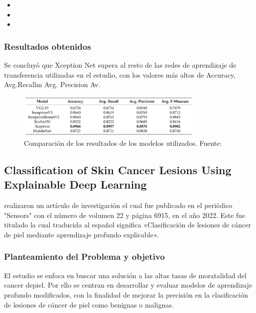 \begin{itemize}
	\item \TIDLone
	\item \TIDLtwo
	\item \TIDLthree
\end{itemize}


\subsubsection{Resultados obtenidos}
Se concluyó que Xception Net supera al resto de las redes de aprendizaje de transferencia utilizadas en el estudio, con los valores más altos de Accuracy, Avg.Recallm Avg. Precision Av.

\begin{figure}[h]
	\begin{center}
		\includegraphics[width=0.8\textwidth]{2/figuras/Deep_Learning_Based_Transfer_Learning_imagen_01.png}
		\caption{Comparación de los resultados de los modelos utilizados. Fuente: \cite{jain2021deep}}
		\label{1:fig 3}
	\end{center}
\end{figure}




\subsection{Classification of Skin Cancer Lesions Using Explainable	Deep Learning \citep*{goceri2023classification}}
\citeauthor{goceri2023classification} realizaron un artículo de investigación el cual fue publicado en el periódico "Sensors" con el número de volumen 22 y página 6915, en el año 2022. Este fue titulado  la cual traducida al español significa «Clasificación de lesiones de cáncer de piel mediante aprendizaje profundo explicable».

\subsubsection{Planteamiento del Problema y objetivo}

El estudio se enfoca en buscar una solución a las altas tasas de moratalidad del cancer depiel. Por ello se  centran en desarrollar y evaluar modelos de aprendizaje profundo modificados, con la finalidad de mejorar la precisión en la clasificación de lesiones de cáncer de piel como benignas o malignas.




